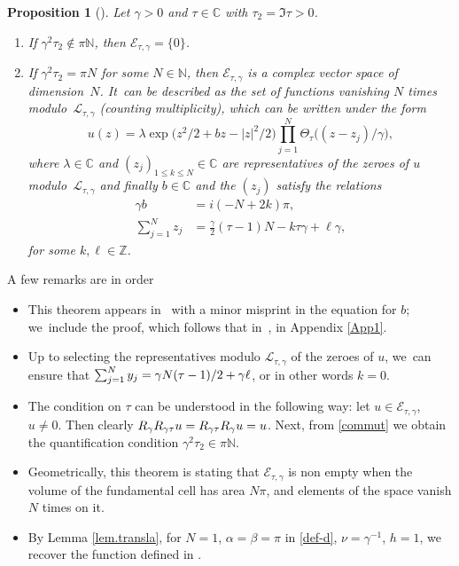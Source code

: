 \documentclass[JEP,XML,SOM,Unicode,NoFloatCountersInSection,published]{cedram}
\newtheorem{prop}[theorem]{Proposition}
\theoremstyle{definition}
\let\EE\exp
\let\dis\relax
\newcommand\C{\mathbb C}
\begin{document}
\begin{prop}[\cite{AftaSerfa}]\label{prop41}
Let $\gamma>0$ and $\tau \in \C$ with $\tau_2=\Im \tau >0$.
\begin{enumerate}
\item If $\gamma^2 \tau_2 \notin\pi \mathbb{N}$, then $\mathcal{E}_{\tau,\gamma} =\{ 0 \}$.
\item If $\gamma^2 \tau_2 = \pi N$ for some $N \in \mathbb{N}$, then $\mathcal{E}_{\tau,\gamma}$ is a complex vector space of dimension~$N$. It~can be described as the set of functions vanishing $N$ times modulo~$\mathcal{L}_{\tau,\gamma}$ (counting multiplicity), which can be written under the form
\begin{equation}\label{formprop}
u(z)=\lambda \EE\bigl(z^2/2 + b z- |z|^2/2\bigr) \prod_{j=1}^N\Theta_{\tau}\bigl(({z-z_j})/{\gamma} \bigr),
\end{equation}
where $\lambda \in \C$ and $(z_j)_{1\leq k\leq N}\in \C$ are representatives of the zeroes of $u$ modulo~$\mathcal{L}_{\tau,\gamma}$ and finally $b \in \mathbb{C}$ and the $(z_j)$ satisfy the relations
\begin{align}\label{somme}
\gamma b &= i(- N + 2k) \pi, \nonumber \\
\sum_{j=1}^N z_j &= \frac{\gamma}{2} (\tau - 1) N - k \tau \gamma + \ell \gamma,
\end{align}
for some $k,\ell \in \mathbb{Z}$.
\end{enumerate}
\end{prop}

A few remarks are in order
\begin{itemize}
\item This theorem appears in~\cite{AftaSerfa} with a minor misprint in the equation for $b$; we~include the proof, which follows that in~\cite{AftaSerfa}, in Appendix \ref{App1}.
\item Up to selecting the representatives modulo $\mathcal{L}_{\tau,\gamma}$ of the zeroes of $u$, we~can ensure that $\dis \sum_{j=1}^N y_j = {\gamma N}(\tau-1)/2+\gamma \ell$, or in other words $k=0$.
\item The condition on $\tau$ can be understood in the following way: let $u \in \mathcal{E}_{\tau,\gamma}$, $u \neq 0$. Then clearly $\dis R_\gamma R_{\gamma \tau} u= R_{\gamma \tau}R_\gamma u =u$. Next, from \eqref{commut} we obtain the quantification condition $\gamma^2 \tau_2 \in\pi \mathbb{N}$.
\item Geometrically, this theorem is stating that $\mathcal{E}_{\tau,\gamma}$ is non empty when the volume of the fundamental cell has area $N\pi$, and elements of the space vanish $N$ times on it.
\item By Lemma \ref{lem.transla}, for $N=1$, $\alpha=\beta=\pi$ in \eqref{def-d}, $\nu=\gamma^{-1}$, $h=1$, we recover the function defined in \cite[Prop.\,4.1]{ABN}.
\end{itemize}
\end{document}
